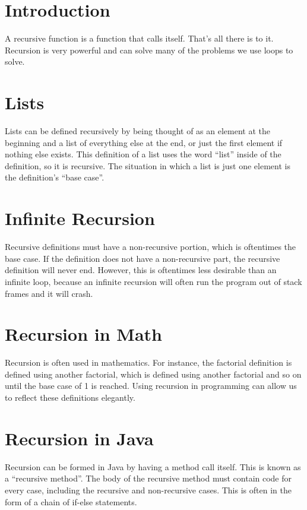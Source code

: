 \documentclass{article}
\begin{document}
\maketitle
\tableofcontents

\section{Introduction}
A recursive function is a function that calls itself. That's all there is to
it. Recursion is very powerful and can solve many of the problems we use loops
to solve.

\section{Lists}
Lists can be defined recursively by being thought of as an element at the
beginning and a list of everything else at the end, or just the first element
if nothing else exists. This definition of a list uses the word ``list'' inside
of the definition, so it is recursive. The situation in which a list is just
one element is the definition's ``base case''.

\section{Infinite Recursion}
Recursive definitions must have a non-recursive portion, which is oftentimes
the base case. If the definition does not have a non-recursive part, the
recursive definition will never end. However, this is oftentimes less desirable
than an infinite loop, because an infinite recursion will often run the program
out of stack frames and it will crash.

\section{Recursion in Math}
Recursion is often used in mathematics. For instance, the factorial definition
is defined using another factorial, which is defined using another factorial
and so on until the base case of 1 is reached. Using recursion in programming
can allow us to reflect these definitions elegantly.

\section{Recursion in Java}
Recursion can be formed in Java by having a method call itself. This is known
as a ``recursive method''. The body of the recursive method must contain code
for every case, including the recursive and non-recursive cases. This is often
in the form of a chain of if-else statements.
\end{document}
